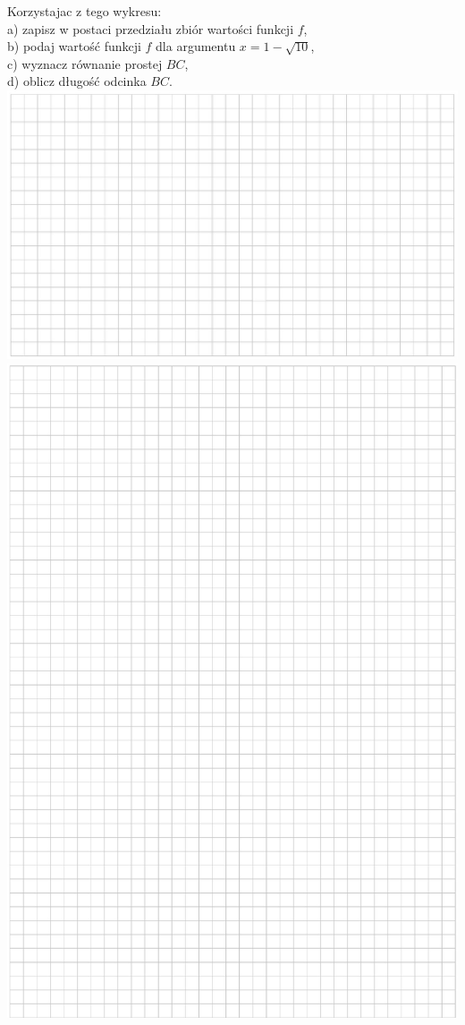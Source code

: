 \documentclass[10pt]{article}
\begin{document}
Korzystajac z tego wykresu:\\
a) zapisz w postaci przedziału zbiór wartości funkcji \(f\),\\
b) podaj wartość funkcji \(f\) dla argumentu \(x=1-\sqrt{10}\),\\
c) wyznacz równanie prostej \(B C\),\\
d) oblicz długość odcinka \(B C\).\\
\includegraphics[max width=\textwidth, center]{2024_11_21_2f72fc0c2faed8928619g-02(1)}\\
\includegraphics[max width=\textwidth, center]{2024_11_21_2f72fc0c2faed8928619g-03}
\end{document}
